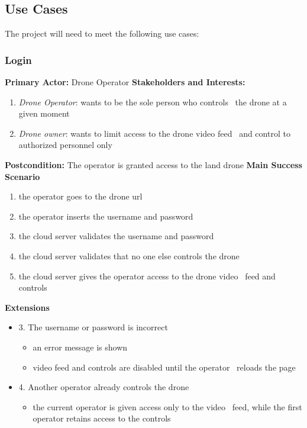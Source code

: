 \subsection{Use Cases}
\label{subsec:use-cases}
The project will need to meet the following use cases:

\subsubsection{Login}
\textbf{Primary Actor:} Drone Operator
\textbf{Stakeholders and Interests:}
\begin{enumerate}
    \item \textit{Drone Operator}: wants to be the sole person who controls \
            the drone at a given moment
    \item \textit{Drone owner}: wants to limit access to the drone video feed \
            and control to authorized personnel only
\end{enumerate}
\textbf{Postcondition:} The operator is granted access to the land drone
\textbf{Main Success Scenario}
\begin{enumerate}
    \item the operator goes to the drone url
    \item the operator inserts the username and password
    \item the cloud server validates the username and password
    \item the cloud server validates that no one else controls the drone
    \item the cloud server gives the operator access to the drone video \
            feed and controls
\end{enumerate}
\textbf{Extensions}
\begin{itemize}
    \item 3. The username or password is incorrect
        \begin{itemize}
            \item an error message is shown
            \item video feed and controls are disabled until the operator \
                    reloads the page
        \end{itemize}
    \item 4. Another operator already controls the drone
        \begin{itemize}
            \item the current operator is given access only to the video \
                    feed, while the first operator retains access to the controls
        \end{itemize}
\end{itemize}

